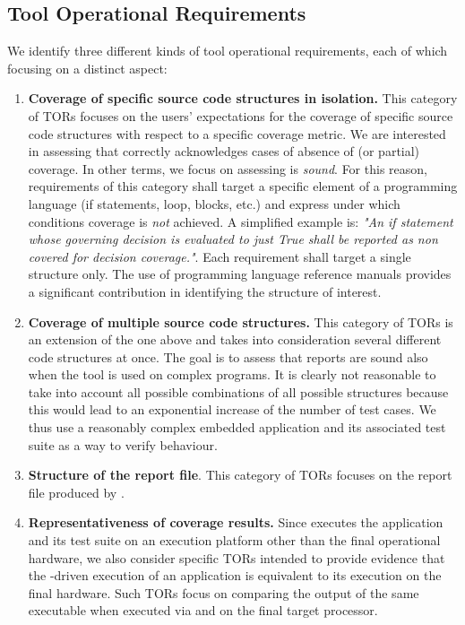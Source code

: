 \documentclass {report}
\begin{document}
\subsection{Tool Operational Requirements}
We identify three different kinds of tool operational requirements, each of which focusing on a distinct aspect:
\begin{enumerate}
\item \textbf{Coverage of specific source code structures in isolation.} This category of TORs focuses on the users' expectations for the coverage of specific source code structures with respect to a specific coverage metric. We are interested in assessing that \xcov{} correctly acknowledges cases of absence of (or partial) coverage. In other terms, we focus on assessing \xcov{} is \emph{sound}. For this reason, requirements of this category shall target a specific element of a programming language (if statements, loop, blocks, etc.) and express under which conditions coverage is \emph{not} achieved. A simplified example is: \emph{"An if statement whose governing decision is evaluated to just True shall be reported as non covered for decision coverage."}. Each requirement shall target a single structure only. The use of programming language reference manuals provides a significant contribution in identifying the structure of interest.

\item \textbf{Coverage of multiple source code structures.} This category of TORs is an extension of the one above and takes into consideration several different code structures at once. The goal is to assess that \xcov{} reports are sound also when the tool is used on complex programs. It is clearly not reasonable to take into account all possible combinations of all possible structures because this would lead to an exponential increase of the number of test cases. We thus use a reasonably complex embedded application and its associated test suite as a way to verify \xcov{} behaviour.

\item \textbf{Structure of the report file}. This category of TORs focuses on the report file produced by \xcov{}.

\item \textbf{Representativeness of coverage results.} Since \xcov{} executes the application and its test suite on an execution platform other than the final operational hardware, we also consider specific TORs intended to provide evidence that the \xcov{}-driven execution of an application is equivalent to its execution on the final hardware. Such TORs focus on comparing the output of the same executable when executed via \xcov{} and on the final target processor.
\end{enumerate}
\end{document}
